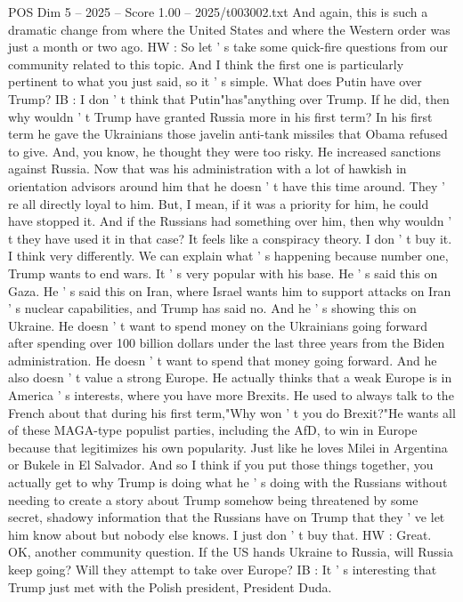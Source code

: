 \begin{textsample}{POS Dim 5 – 2025 – Score 1.00 – 2025/t003002.txt}
And again, this is such a dramatic change from where the United States and where the Western order was just a month or two ago.
HW : So let ' s take some quick-fire questions from our community related to this topic.
And I think the first one is particularly pertinent to what you just said, so it ' s simple.
What does Putin have over Trump?
IB : I don ' t think that Putin"has"anything over Trump.
If he did, then why wouldn ' t Trump have granted Russia more in his first term?
In his first term he gave the Ukrainians those javelin anti-tank missiles that Obama refused to give.
And, you know, he thought they were too risky.
He increased sanctions against Russia.
Now that was his administration with a lot of hawkish in orientation advisors around him that he doesn ' t have this time around.
They ' re all directly loyal to him.
But, I mean, if it was a priority for him, he could have stopped it.
And if the Russians had something over him, then why wouldn ' t they have used it in that case?
It feels like a conspiracy theory.
I don ' t buy it.
I think very differently.
We can explain what ' s happening because number one, Trump wants to end wars.
It ' s very popular with his base.
He ' s said this on Gaza.
He ' s said this on Iran, where Israel wants him to support attacks on Iran ' s nuclear capabilities, and Trump has said no.
And he ' s showing this on Ukraine.
He doesn ' t want to spend money on the Ukrainians going forward after spending over 100 billion dollars under the last three years from the Biden administration.
He doesn ' t want to spend that money going forward.
And he also doesn ' t value a strong Europe.
He actually thinks that a weak Europe is in America ' s interests, where you have more Brexits.
He used to always talk to the French about that during his first term,"Why won ' t you do Brexit?"He wants all of these MAGA-type populist parties, including the AfD, to win in Europe because that legitimizes his own popularity.
Just like he loves Milei in Argentina or Bukele in El Salvador.
And so I think if you put those things together, you actually get to why Trump is doing what he ' s doing with the Russians without needing to create a story about Trump somehow being threatened by some secret, shadowy information that the Russians have on Trump that they ' ve let him know about but nobody else knows.
I just don ' t buy that.
HW : Great.
OK, another community question.
If the US hands Ukraine to Russia, will Russia keep going?
Will they attempt to take over Europe?
IB : It ' s interesting that Trump just met with the Polish president, President Duda.

\end{textsample}
